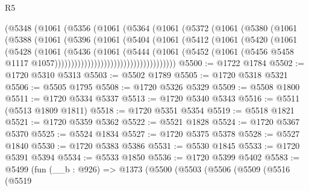 \begin{lexlean}{R5}
\begin{coremodule}
                    (@5348
                      (@1061
                        (@5356
                          (@1061
                            (@5364
                              (@1061
                                (@5372
                                  (@1061
                                    (@5380
                                      (@1061
                                        (@5388
                                          (@1061
                                            (@5396
                                              (@1061
                                                (@5404
                                                  (@1061
                                                    (@5412
                                                      (@1061
                                                        (@5420
                                                          (@1061
                                                            (@5428
                                                              (@1061
                                                                (@5436
                                                                  (@1061
                                                                    (@5444
                                                                      (@1061
                                                                        (@5452
                                                                          (@1061
                                                                            (@5456
                                                                              @5458
                                                                              @1117
                                                                              @1057)))))))))))))))))))))))))))))))))))))
@5500 := @1722 @1784
@5502 := @1720 @5310 @5313
@5503 := @5502 @1789
@5505 := @1720 @5318 @5321
@5506 := @5505 @1795
@5508 := @1720 @5326 @5329
@5509 := @5508 @1800
@5511 := @1720 @5334 @5337
@5513 := @1720 @5340 @5343
@5516 := @5511 (@5513 @1809 @1811)
@5518 := @1720 @5351 @5354
@5519 := @5518 @1821
@5521 := @1720 @5359 @5362
@5522 := @5521 @1828
@5524 := @1720 @5367 @5370
@5525 := @5524 @1834
@5527 := @1720 @5375 @5378
@5528 := @5527 @1840
@5530 := @1720 @5383 @5386
@5531 := @5530 @1845
@5533 := @1720 @5391 @5394
@5534 := @5533 @1850
@5536 := @1720 @5399 @5402
@5583 := @5499
    (fun (__b : @926) =>
    @1373
      (@5500
        (@5503
          (@5506
            (@5509
              (@5516
                (@5519

\end{coremodule}
\end{lexlean}
